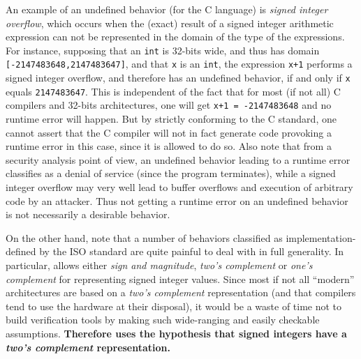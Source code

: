 An example of an undefined behavior (for the C language) is {\it signed integer
  overflow}, which occurs when the (exact) result of a signed integer arithmetic
expression can not be represented in the domain of the type of the
expressions. For instance, supposing that an \lstinline|int| is 32-bits wide,
and thus has domain \lstinline|[-2147483648,2147483647]|, and that \lstinline|x|
is an \lstinline|int|, the expression \lstinline|x+1| performs a signed integer
overflow, and therefore has an undefined behavior, if and only if \lstinline|x|
equals \lstinline|2147483647|.  This is independent of the fact that for most
(if not all) C compilers and 32-bits architectures, one will get
\lstinline|x+1 = -2147483648| and no runtime error will happen.  But by strictly
conforming to
the C standard, one cannot assert that the C compiler will not in fact generate
code provoking a runtime error in this case, since it is allowed to do so.
Also note that from a security analysis point of view, an undefined behavior
leading to a runtime error classifies as a denial of service (since the program
terminates), while a signed integer overflow may very well lead to buffer
overflows and execution of arbitrary code by an attacker.  Thus not getting a
runtime error on an undefined behavior is not necessarily a desirable behavior.

On the other hand, note that a number of behaviors classified as
implementation-defined by the ISO standard are quite painful to deal with in
full generality.  In particular, \cnn{} allows either {\it sign and magnitude},
{\it two's complement} or {\it one's complement} for representing signed integer
values.  Since most if not all ``modern'' architectures are based on a {\it
  two's complement} representation (and that compilers tend to use the hardware
at their disposal), it would be a waste of time not to build verification tools
by making such wide-ranging and easily checkable assumptions.  {\bf Therefore
  \rte{} uses the hypothesis that signed integers have a {\it two's complement}
  representation.}


